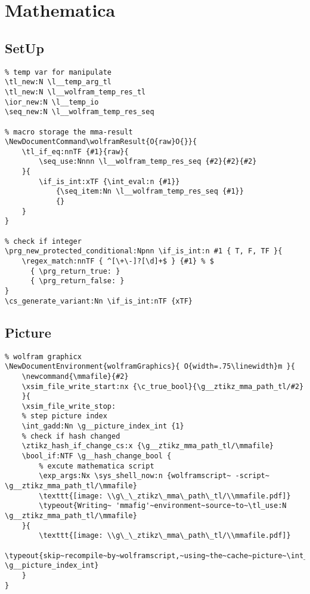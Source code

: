 \section{Mathematica}
\subsection{SetUp}
\begin{verbatim}
% temp var for manipulate
\tl_new:N \l__temp_arg_tl
\tl_new:N \l__wolfram_temp_res_tl
\ior_new:N \l__temp_io
\seq_new:N \l__wolfram_temp_res_seq

% macro storage the mma-result
\NewDocumentCommand\wolframResult{O{raw}O{}}{
    \tl_if_eq:nnTF {#1}{raw}{
        \seq_use:Nnnn \l__wolfram_temp_res_seq {#2}{#2}{#2}
    }{
        \if_is_int:xTF {\int_eval:n {#1}}
            {\seq_item:Nn \l__wolfram_temp_res_seq {#1}}
            {}
    }
}

% check if integer
\prg_new_protected_conditional:Npnn \if_is_int:n #1 { T, F, TF }{
    \regex_match:nnTF { ^[\+\-]?[\d]+$ } {#1} % $
      { \prg_return_true: }
      { \prg_return_false: }
}
\cs_generate_variant:Nn \if_is_int:nTF {xTF}
\end{verbatim}

\subsection{Picture}
\begin{verbatim}
% wolfram graphicx
\NewDocumentEnvironment{wolframGraphics}{ O{width=.75\linewidth}m }{
    \newcommand{\mmafile}{#2}
    \xsim_file_write_start:nx {\c_true_bool}{\g__ztikz_mma_path_tl/#2}
    }{ 
    \xsim_file_write_stop:
    % step picture index
    \int_gadd:Nn \g__picture_index_int {1}   
    % check if hash changed
    \ztikz_hash_if_change_cs:x {\g__ztikz_mma_path_tl/\mmafile}   
    \bool_if:NTF \g__hash_change_bool {
        % excute mathematica script
        \exp_args:Nx \sys_shell_now:n {wolframscript~ -script~ \g__ztikz_mma_path_tl/\mmafile} 
        \texttt{[image: \\g\_\_ztikz\_mma\_path\_tl/\\mmafile.pdf]}
        \typeout{Writing~ 'mmafig'~environment~source~to~\tl_use:N \g__ztikz_mma_path_tl/\mmafile}
    }{
        \texttt{[image: \\g\_\_ztikz\_mma\_path\_tl/\\mmafile.pdf]}
        \typeout{skip~recompile~by~wolframscript,~using~the~cache~picture~\int_use:N \g__picture_index_int}
    }
}
\end{verbatim}


